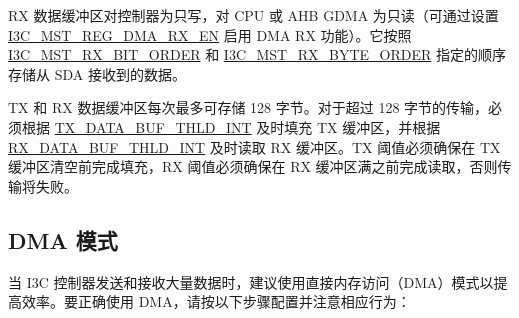 \documentclass[main\_\_CN.tex]{subfiles}
\begin{document}
RX 数据缓冲区对控制器为只写，对 CPU 或 AHB GDMA 为只读（可通过设置 \hyperref[fielddesc:I3CMSTREGDMARXEN]{I3C\_MST\_REG\_DMA\_RX\_EN} 启用 DMA RX 功能）。它按照 \hyperref[fielddesc:I3CMSTREGRXBITORDER]{I3C\_MST\_RX\_BIT\_ORDER} 和 \hyperref[fielddesc:I3CMSTREGRXBYTEORDER]{I3C\_MST\_RX\_BYTE\_ORDER} 指定的顺序存储从 SDA 接收到的数据。

TX 和 RX 数据缓冲区每次最多可存储 128 字节。对于超过 128 字节的传输，必须根据 \hyperref[int:TXDATABUFTHLDINT]{TX\_DATA\_BUF\_THLD\_INT} 及时填充 TX 缓冲区，并根据 \hyperref[int:RXDATABUFTHLDINT]{RX\_DATA\_BUF\_THLD\_INT} 及时读取 RX 缓冲区。TX 阈值必须确保在 TX 缓冲区清空前完成填充，RX 阈值必须确保在 RX 缓冲区满之前完成读取，否则传输将失败。

\subsection{DMA 模式}

当 I3C 控制器发送和接收大量数据时，建议使用直接内存访问（DMA）模式以提高效率。要正确使用 DMA，请按以下步骤配置并注意相应行为：
\end{document}
